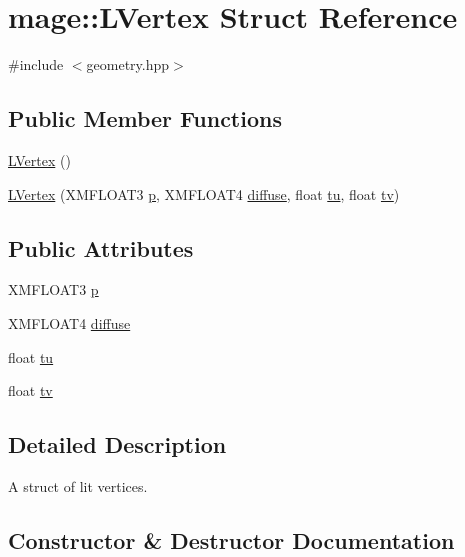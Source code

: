 \hypertarget{structmage_1_1_l_vertex}{}\section{mage\+:\+:L\+Vertex Struct Reference}
\label{structmage_1_1_l_vertex}


{\ttfamily \#include $<$geometry.\+hpp$>$}

\subsection*{Public Member Functions}
\begin{DoxyCompactItemize}
\item 
\hyperlink{structmage_1_1_l_vertex_abfc69fb38d5f37b07d1c420a23a3e7f9}{L\+Vertex} ()
\item 
\hyperlink{structmage_1_1_l_vertex_a262af68c7c50c1003bcbd941b504fe70}{L\+Vertex} (X\+M\+F\+L\+O\+A\+T3 \hyperlink{structmage_1_1_l_vertex_afdf01d172b1992d4e4f37b9ad9fb2d27}{p}, X\+M\+F\+L\+O\+A\+T4 \hyperlink{structmage_1_1_l_vertex_abfe65c089e650ad20ed41de8e2b585dd}{diffuse}, float \hyperlink{structmage_1_1_l_vertex_a820b1dba91a65e4be9a41c4297970dd6}{tu}, float \hyperlink{structmage_1_1_l_vertex_ab5e712d5befd3b8e3b58c772e6d3bf50}{tv})
\end{DoxyCompactItemize}
\subsection*{Public Attributes}
\begin{DoxyCompactItemize}
\item 
X\+M\+F\+L\+O\+A\+T3 \hyperlink{structmage_1_1_l_vertex_afdf01d172b1992d4e4f37b9ad9fb2d27}{p}
\item 
X\+M\+F\+L\+O\+A\+T4 \hyperlink{structmage_1_1_l_vertex_abfe65c089e650ad20ed41de8e2b585dd}{diffuse}
\item 
float \hyperlink{structmage_1_1_l_vertex_a820b1dba91a65e4be9a41c4297970dd6}{tu}
\item 
float \hyperlink{structmage_1_1_l_vertex_ab5e712d5befd3b8e3b58c772e6d3bf50}{tv}
\end{DoxyCompactItemize}


\subsection{Detailed Description}
A struct of lit vertices. 

\subsection{Constructor \& Destructor Documentation}
\hypertarget{structmage_1_1_l_vertex_abfc69fb38d5f37b07d1c420a23a3e7f9}{}\label{structmage_1_1_l_vertex_abfc69fb38d5f37b07d1c420a23a3e7f9} 
